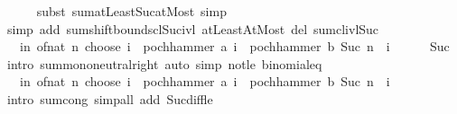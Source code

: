 \begin{isabellebody}
\ \ \ \ \isamarkupfalse%
\ {\isacharparenleft}{\kern0pt}subst\ sum{\isachardot}{\kern0pt}atLeast{\isacharunderscore}{\kern0pt}Suc{\isacharunderscore}{\kern0pt}atMost{\isacharcomma}{\kern0pt}\ simp{\isacharparenright}{\kern0pt}\isanewline
\ \ \ \ \isamarkupfalse%
\ {\isacharparenleft}{\kern0pt}simp\ add{\isacharcolon}{\kern0pt}\ sum{\isachardot}{\kern0pt}shift{\isacharunderscore}{\kern0pt}bounds{\isacharunderscore}{\kern0pt}cl{\isacharunderscore}{\kern0pt}Suc{\isacharunderscore}{\kern0pt}ivl\ atLeast{}AtMost\ del{\isacharcolon}{\kern0pt}\ sum{\isachardot}{\kern0pt}cl{\isacharunderscore}{\kern0pt}ivl{\isacharunderscore}{\kern0pt}Suc{\isacharparenright}{\kern0pt}\isanewline
\ \ \ \ \isamarkupfalse%
\isanewline
\ \ \isamarkupfalse%
\ \isamarkupfalse%
\ {\isachardoublequoteopen}{\isasymdots}\ {\isacharequal}{\kern0pt}\ {\isacharparenleft}{\kern0pt}{\isasymSum}i{\isasymle}n{\isachardot}{\kern0pt}\ of{\isacharunderscore}{\kern0pt}nat\ {\isacharparenleft}{\kern0pt}n\ choose\ i{\isacharparenright}{\kern0pt}\ {\isacharasterisk}{\kern0pt}\ pochhammer\ a\ i\ {\isacharasterisk}{\kern0pt}\ pochhammer\ b\ {\isacharparenleft}{\kern0pt}Suc\ n\ {\isacharminus}{\kern0pt}\ i{\isacharparenright}{\kern0pt}{\isacharparenright}{\kern0pt}{\isachardoublequoteclose}\isanewline
\ \ \ \ \isamarkupfalse%
\ Suc\ \isamarkupfalse%
\ {\isacharparenleft}{\kern0pt}intro\ sum{\isachardot}{\kern0pt}mono{\isacharunderscore}{\kern0pt}neutral{\isacharunderscore}{\kern0pt}right{\isacharparenright}{\kern0pt}\ {\isacharparenleft}{\kern0pt}auto\ simp{\isacharcolon}{\kern0pt}\ not{\isacharunderscore}{\kern0pt}le\ binomial{\isacharunderscore}{\kern0pt}eq{\isacharunderscore}{\kern0pt}{}{\isacharparenright}{\kern0pt}\isanewline
\ \ \isamarkupfalse%
\ \isamarkupfalse%
\ {\isachardoublequoteopen}{\isasymdots}\ {\isacharequal}{\kern0pt}\ {\isacharparenleft}{\kern0pt}{\isasymSum}i{\isasymle}n{\isachardot}{\kern0pt}\ of{\isacharunderscore}{\kern0pt}nat\ {\isacharparenleft}{\kern0pt}n\ choose\ i{\isacharparenright}{\kern0pt}\ {\isacharasterisk}{\kern0pt}\ pochhammer\ a\ i\ {\isacharasterisk}{\kern0pt}\ pochhammer\ b\ {\isacharparenleft}{\kern0pt}Suc\ {\isacharparenleft}{\kern0pt}n\ {\isacharminus}{\kern0pt}\ i{\isacharparenright}{\kern0pt}{\isacharparenright}{\kern0pt}{\isacharparenright}{\kern0pt}{\isachardoublequoteclose}\isanewline
\ \ \ \ \isamarkupfalse%
\ {\isacharparenleft}{\kern0pt}intro\ sum{\isachardot}{\kern0pt}cong{\isacharparenright}{\kern0pt}\ {\isacharparenleft}{\kern0pt}simp{\isacharunderscore}{\kern0pt}all\ add{\isacharcolon}{\kern0pt}\ Suc{\isacharunderscore}{\kern0pt}diff{\isacharunderscore}{\kern0pt}le{\isacharparenright}{\kern0pt}\isanewline

\end{isabellebody}
